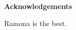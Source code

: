 \newpage
{\Huge \bf Acknowledgements}
\vspace{24pt} 


Ramona is the best.

\newpage
\vspace*{\fill}
